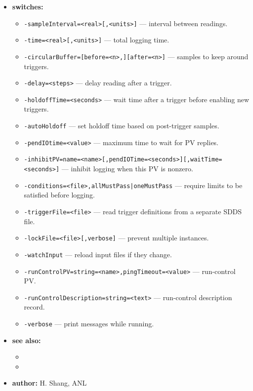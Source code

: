 \begin{itemize}
\item {\bf switches:}
    \begin{itemize}
    \item {\tt -sampleInterval=<real>[,<units>]} --- interval between readings.
    \item {\tt -time=<real>[,<units>]} --- total logging time.
    \item {\tt -circularBuffer=[before=<n>,][after=<n>]} --- samples to keep around triggers.
    \item {\tt -delay=<steps>} --- delay reading after a trigger.
    \item {\tt -holdoffTime=<seconds>} --- wait time after a trigger before enabling new triggers.
    \item {\tt -autoHoldoff} --- set holdoff time based on post-trigger samples.
    \item {\tt -pendIOtime=<value>} --- maximum time to wait for PV replies.
    \item {\tt -inhibitPV=name=<name>[,pendIOTime=<seconds>][,waitTime=<seconds>]} --- inhibit logging when this PV is nonzero.
    \item {\tt -conditions=<file>,{allMustPass|oneMustPass}} --- require limits to be satisfied before logging.
    \item {\tt -triggerFile=<file>} --- read trigger definitions from a separate SDDS file.
    \item {\tt -lockFile=<file>[,verbose]} --- prevent multiple instances.
    \item {\tt -watchInput} --- reload input files if they change.
    \item {\tt -runControlPV=string=<name>,pingTimeout=<value>} --- run-control PV.
    \item {\tt -runControlDescription=string=<text>} --- run-control description record.
    \item {\tt -verbose} --- print messages while running.
    \end{itemize}

\item {\bf see also:}
    \begin{itemize}
    \item {}
    \item {}
    \end{itemize}

\item {\bf author:} H. Shang, ANL
\end{itemize}

